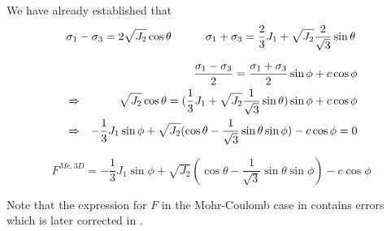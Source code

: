 We have already established that 
\begin{eqnarray}
\sigma_1 - \sigma_3  = 2 \sqrt{J_2} \cos \theta \quad\quad\quad
\sigma_1 + \sigma_3  = \frac{2}{3}J_1 + \sqrt{J_2} \frac{2}{\sqrt{3}} \sin \theta \nonumber
\end{eqnarray}


\begin{eqnarray}
&& \frac{\sigma_1 - \sigma_3}{2} = \frac{\sigma_1 + \sigma_3}{2} \sin \phi  + c \cos \phi \nonumber\\
&\Rightarrow&
\sqrt{J_2} \cos \theta = (\frac{1}{3}J_1 + \sqrt{J_2} \frac{1}{\sqrt{3}} \sin \theta ) \sin \phi + c \cos \phi \nonumber\\
&\Rightarrow&
-\frac{1}{3}J_1 \sin \phi  + \sqrt{J_2} ( \cos \theta - \frac{1}{\sqrt{3}} \sin \theta  \sin \phi ) - c \cos \phi = 0 \nonumber
\end{eqnarray}

\begin{mdframed}[backgroundcolor=blue!5]
\[
F^{Mc,3D}=-\frac{1}{3}J_1 \sin \phi  + \sqrt{J_2} ( \cos \theta - \frac{1}{\sqrt{3}} \sin \theta  \sin \phi ) - c \cos \phi 
\]
\end{mdframed}

Note that the expression for $F$ in the Mohr-Coulomb case in \cite{zico74} contains errors
which is later corrected in \cite[p102]{book_zitf}. 


